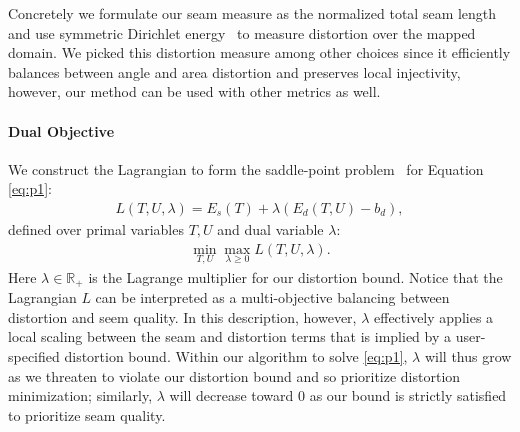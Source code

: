 Concretely we formulate our seam measure as the normalized total seam length and use symmetric Dirichlet energy~\cite{Smith2015Bijective} to measure distortion over the mapped domain. We picked this distortion measure among other choices since it efficiently balances between angle and area distortion and preserves local injectivity, however, our method can be used with other metrics as well. 
%
%

%


\paragraph{Dual Objective}
We construct the Lagrangian to form the saddle-point problem~\cite{} for Equation \ref{eq:p1}:
\begin{align}
	L(T,U,\lambda) = E_s(T) + \lambda(E_d(T,U) - b_d),
	\label{eq:L}
\end{align}
%
defined over primal variables $T,U$ and dual variable $\lambda$:
%
\begin{align}
	\min_{T,U} \max_{\lambda\geq0} L(T,U,\lambda).
	\label{eq:p2}
\end{align}
%
Here $\lambda \in \mathbb{R_+}$ is the Lagrange multiplier for our distortion bound. Notice that the Lagrangian $L$ can be interpreted as a multi-objective balancing between distortion and seem quality. In this description, however, $\lambda$ effectively applies a local scaling between the seam and distortion terms that is implied %
by a user-specified distortion bound. Within our algorithm to solve \eqref{eq:p1}, $\lambda$ will thus grow as we threaten to violate our distortion bound and so prioritize distortion minimization; similarly, $\lambda$ will decrease toward $0$ as our bound is strictly satisfied to prioritize seam quality.


